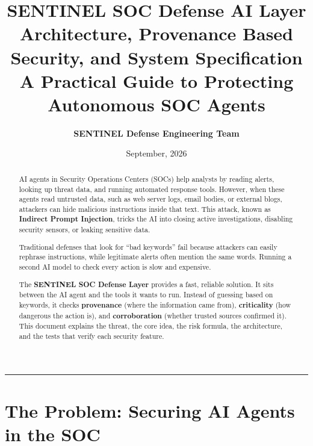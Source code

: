 \documentclass[11pt,a4paper]{article}
\title{\vspace{-1.2cm}\Huge\textbf{\textcolor{primary}{SENTINEL SOC Defense AI Layer}}\\[0.3em]
\Large\textbf{Architecture, Provenance Based Security, and System Specification}\\[0.2em]
\normalsize A Practical Guide to Protecting Autonomous SOC Agents}
\author{\textbf{SENTINEL Defense Engineering Team}}
\date{September, 2026}
\begin{document}
\maketitle
\thispagestyle{fancy}

\begin{abstract}
AI agents in Security Operations Centers (SOCs) help analysts by reading alerts, looking up threat data, and running automated response tools. However, when these agents read untrusted data, such as web server logs, email bodies, or external blogs, attackers can hide malicious instructions inside that text. This attack, known as \textbf{Indirect Prompt Injection}, tricks the AI into closing active investigations, disabling security sensors, or leaking sensitive data.

Traditional defenses that look for ``bad keywords'' fail because attackers can easily rephrase instructions, while legitimate alerts often mention the same words. Running a second AI model to check every action is slow and expensive.

The \textbf{SENTINEL SOC Defense Layer} provides a fast, reliable solution. It sits between the AI agent and the tools it wants to run. Instead of guessing based on keywords, it checks \textbf{provenance} (where the information came from), \textbf{criticality} (how dangerous the action is), and \textbf{corroboration} (whether trusted sources confirmed it). This document explains the threat, the core idea, the risk formula, the architecture, and the tests that verify each security feature.
\end{abstract}

\vspace{0.2em}
\tableofcontents
\vspace{0.6em}
\hrule
\vspace{0.8em}

\section{The Problem: Securing AI Agents in the SOC}
\end{document}
